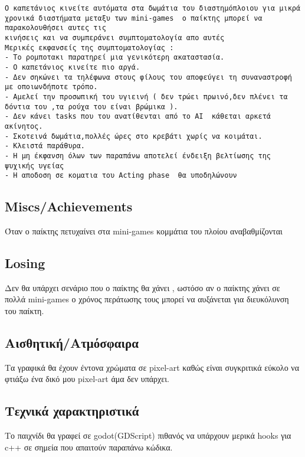 \documentclass[
]{article}
\begin{document}
\begin{verbatim}
Ο καπετάνιος κινείτε αυτόματα στα δωμάτια του διαστημόπλοιου για μικρά χρονικά διαστήματα μεταξυ των mini-games  ο παίκτης μπορεί να παρακολουθήσει αυτες τις 
κινήσεις και να συμπεράνει συμπτοματολογία απο αυτές
Μερικές εκφανσείς της συμπτοματολογίας :  
- Το ρομποτακι παρατηρεί μια γενικότερη ακαταστασία.
- Ο καπετάνιος κινείτε πιο αργά. 
- Δεν σηκώνει τα τηλέφωνα στους φίλους του αποφεύγει τη συναναστροφή με οποιωνδήποτε τρόπο.
- Αμελεί την προσωπική του υγιεινή ( δεν τρώει πρωινό,δεν πλένει τα δόντια του ,τα ρούχα του είναι βρώμικα ).
- Δεν κάνει tasks που του ανατίθενται από το AΙ  κάθεται αρκετά ακίνητος.
- Σκοτεινά δωμάτια,πολλές ώρες στο κρεβάτι χωρίς να κοιμάται.
- Κλειστά παράθυρα.
- Η μη έκφανση όλων των παραπάνω αποτελεί ένδειξη βελτίωσης της ψυχικής υγείας
- Η αποδοση σε κοματια του Acting phase  θα υποδηλώνουν 
\end{verbatim}

\hypertarget{miscsachievements}{%
\subsection{Miscs/Achievements}\label{miscsachievements}}

Όταν ο παίκτης πετυχαίνει στα mini-games κομμάτια του πλοίου
αναβαθμίζονται

\hypertarget{losing}{%
\subsection{Losing}\label{losing}}

Δεν θα υπάρχει σενάριο που ο παίκτης θα χάνει , ωστόσο αν ο παίκτης
χάνει σε πολλά mini-games ο χρόνος περάτωσης τους μπορεί να αυξάνεται
για διευκόλυνση του παίκτη.

\hypertarget{ux3b1ux3b9ux3c3ux3b8ux3b7ux3c4ux3b9ux3baux3aeux3b1ux3c4ux3bcux3ccux3c3ux3c6ux3b1ux3b9ux3c1ux3b1}{%
\subsection{Αισθητική/Ατμόσφαιρα}\label{ux3b1ux3b9ux3c3ux3b8ux3b7ux3c4ux3b9ux3baux3aeux3b1ux3c4ux3bcux3ccux3c3ux3c6ux3b1ux3b9ux3c1ux3b1}}

Τα γραφικά θα έχουν έντονα χρώματα σε pixel-art καθώς είναι συγκριτικά
εύκολο να φτιάξω ένα δικό μου pixel-art άμα δεν υπάρχει.

\hypertarget{ux3c4ux3b5ux3c7ux3bdux3b9ux3baux3ac-ux3c7ux3b1ux3c1ux3b1ux3baux3c4ux3b7ux3c1ux3b9ux3c3ux3c4ux3b9ux3baux3ac}{%
\subsection{Τεχνικά
χαρακτηριστικά}\label{ux3c4ux3b5ux3c7ux3bdux3b9ux3baux3ac-ux3c7ux3b1ux3c1ux3b1ux3baux3c4ux3b7ux3c1ux3b9ux3c3ux3c4ux3b9ux3baux3ac}}

Το παιχνίδι θα γραφεί σε godot(GDScript) πιθανός να υπάρχουν μερικά
hooks για c++ σε σημεία που απαιτούν παραπάνω κώδικα.
\end{document}
